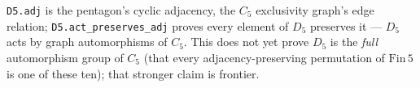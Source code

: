 \begin{theorem}\label{thm:d5-preserves-c5}\leanok{}
\texttt{D5.adj} is the pentagon's cyclic adjacency, the $C_5$ exclusivity graph's edge relation;
\texttt{D5.act\_preserves\_adj} proves every element of $D_5$ preserves it --- $D_5$ acts by graph
automorphisms of $C_5$. This does not yet prove $D_5$ is the \emph{full} automorphism group of
$C_5$ (that every adjacency-preserving permutation of $\mathrm{Fin}\,5$ is one of these ten); that
stronger claim is frontier.
\end{theorem}
